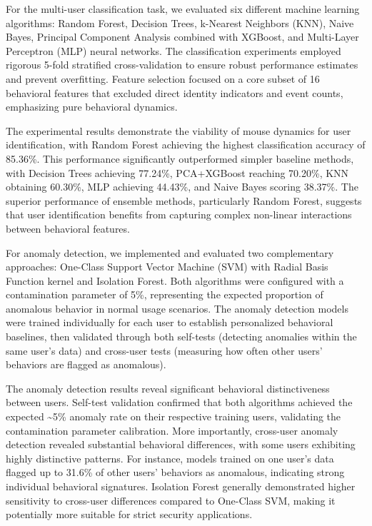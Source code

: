 \documentclass[
  12pt,
  a4paper,
]{report}
\begin{document}
For the multi-user classification task, we evaluated six different
machine learning algorithms: Random Forest, Decision Trees, k-Nearest
Neighbors (KNN), Naive Bayes, Principal Component Analysis combined with
XGBoost, and Multi-Layer Perceptron (MLP) neural networks. The
classification experiments employed rigorous 5-fold stratified
cross-validation to ensure robust performance estimates and prevent
overfitting. Feature selection focused on a core subset of 16 behavioral
features that excluded direct identity indicators and event counts,
emphasizing pure behavioral dynamics.

The experimental results demonstrate the viability of mouse dynamics for
user identification, with Random Forest achieving the highest
classification accuracy of 85.36\%. This performance significantly
outperformed simpler baseline methods, with Decision Trees achieving
77.24\%, PCA+XGBoost reaching 70.20\%, KNN obtaining 60.30\%, MLP
achieving 44.43\%, and Naive Bayes scoring 38.37\%. The superior
performance of ensemble methods, particularly Random Forest, suggests
that user identification benefits from capturing complex non-linear
interactions between behavioral features.

For anomaly detection, we implemented and evaluated two complementary
approaches: One-Class Support Vector Machine (SVM) with Radial Basis
Function kernel and Isolation Forest. Both algorithms were configured
with a contamination parameter of 5\%, representing the expected
proportion of anomalous behavior in normal usage scenarios. The anomaly
detection models were trained individually for each user to establish
personalized behavioral baselines, then validated through both
self-tests (detecting anomalies within the same user's data) and
cross-user tests (measuring how often other users' behaviors are flagged
as anomalous).

The anomaly detection results reveal significant behavioral
distinctiveness between users. Self-test validation confirmed that both
algorithms achieved the expected \textasciitilde5\% anomaly rate on
their respective training users, validating the contamination parameter
calibration. More importantly, cross-user anomaly detection revealed
substantial behavioral differences, with some users exhibiting highly
distinctive patterns. For instance, models trained on one user's data
flagged up to 31.6\% of other users' behaviors as anomalous, indicating
strong individual behavioral signatures. Isolation Forest generally
demonstrated higher sensitivity to cross-user differences compared to
One-Class SVM, making it potentially more suitable for strict security
applications.
\end{document}
